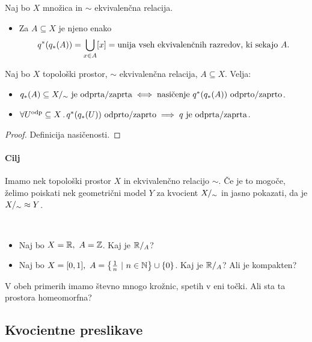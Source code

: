\newpage
\begin{definicija}
    Naj bo \(X\) množica in \(\sim\) ekvivalenčna relacija. 
    \begin{itemize}
        \item Za \(A \subseteq X\) je njeno  enako \[q^{*}(q_{*}(A)) = \bigcup_{x \in A} [x] = \text{unija vseh ekvivalenčnih razredov, ki sekajo} \ A.\]
    \end{itemize}
\end{definicija}

\begin{trditev}
    Naj bo \(X\) topološki prostor, \(\sim\) ekvivalenčna relacija, \(A \subseteq X\). Velja:
    \begin{itemize}
        \item \(\img{q}(A) \subseteq \qs{X} \ \text{je odprta/zaprta} \liff  \text{nasičenje} \ \invimg{q}(\img{q}(A)) \ \text{odprto/zaprto}\). 
        \item \(\forall U^{\text{odp}} \subseteq X \,.\, q^{*}(q_{*}(U)) \ \text{odprto/zaprto} \implies q \ \text{je odprta/zaprta}\).
    \end{itemize}
\end{trditev}

\begin{proof}
    Definicija nasičenosti.
\end{proof}

\paragraph{Cilj} Imamo nek topološki prostor \(X\) in ekvivalenčno relacijo \(\sim\). Če je to mogoče, želimo poiskati nek geometrični model \(Y\) za kvocient \({X/_\sim}\) in jasno pokazati, da je \({X/_\sim} \approx Y\).

\begin{primer}
    \
    \begin{itemize}
        \item Naj bo \(X = \mathbb{R}, \ A = \mathbb{Z}\). Kaj je \(\mathbb{R}/_{A}\)?
        \item Naj bo \(X = [0,1], \ A = \left\{\frac{1}{n} \ | \ n \in \mathbb{N}\right\} \cup \left\{0\right\}\). Kaj je \(\mathbb{R}/_{A}\)? Ali je kompakten?
    \end{itemize}
    V obeh primerih imamo števno mnogo krožnic, spetih v eni točki. Ali sta ta prostora homeomorfna?
\end{primer}

\subsection{Kvocientne preslikave}
